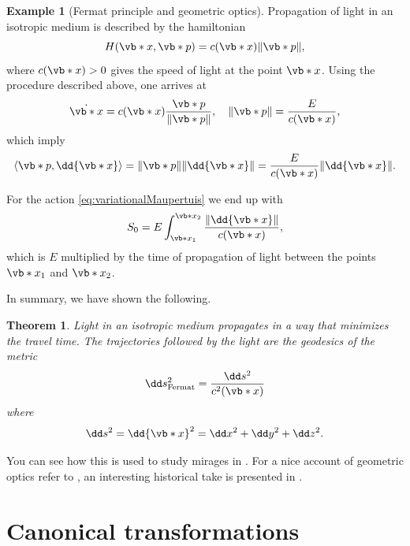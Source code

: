 \documentclass[english,fontsize=11pt,paper=b5]{scrbook}
\numberwithin{equation}{chapter}
\newtheorem{theorem}{Theorem}[chapter]
\theoremstyle{definition}
\newtheorem{example}{Example}[chapter]
\begin{document}
    \begin{example}[Fermat principle and geometric optics]
      Propagation of light in an isotropic medium is described by the hamiltonian
      \begin{equation}
        H(\vb*{x}, \vb*{p}) = c(\vb*{x}) \|\vb*{p}\|,
      \end{equation}
      where $c(\vb*{x}) > 0$ gives the speed of light at the point $\vb*{x}$.
      Using the procedure described above, one arrives at
      \begin{equation}
        \dot{\vb*{x}} = c(\vb*{x})\frac{\vb*{p}}{\|\vb*{p}\|}, \quad
        \|\vb*{p}\| = \frac{E}{c(\vb*{x})},
      \end{equation}
      which imply
      \begin{equation}
        \langle\vb*{p}, \dd{\vb*{x}}\rangle = \|\vb*{p}\|\|\dd{\vb*{x}}\| = \frac{E}{c(\vb*{x})}\|\dd{\vb*{x}}\|.
      \end{equation}

      For the action \eqref{eq:variationalMaupertuis} we end up with
      \begin{equation}
        S_0 = E \int_{\vb*{x}_1}^{\vb*{x}_2} \frac{\|\dd{\vb*{x}}\|}{c(\vb*{x})},
      \end{equation}
      which is $E$ multiplied by the time of propagation of light between the points $\vb*{x}_1$ and $\vb*{x}_2$.

      In summary, we have shown the following.
      \begin{theorem}
        Light in an isotropic medium propagates in a way that minimizes the travel time.
        The trajectories followed by the light are the geodesics of the metric
        \begin{equation}
          \dd s^2_{\mathrm{Fermat}} = \frac{\dd s^2}{c^2(\vb*{x})}
        \end{equation}
        where
        \begin{equation}
          \dd s^2 = \dd{\vb*{x}}^2 = \dd x^2 + \dd y^2 + \dd z^2.
        \end{equation}
      \end{theorem}

      You can see how this is used to study mirages in \cite[Example 8.34]{book:knauf}.
      For a nice account of geometric optics refer to \cite[Chapter 8.7]{book:knauf}, an interesting historical take is presented in \cite{book:broer}.
    \end{example}

    \section{Canonical transformations}
\end{document}
